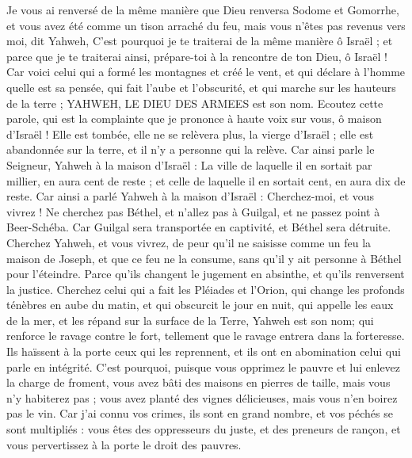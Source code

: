 \begin{multicols}{2}
Je vous ai renversé de la même manière que Dieu renversa Sodome et Gomorrhe, et vous avez été comme un tison arraché du feu, mais vous n'êtes pas revenus vers moi, dit Yahweh,
C'est pourquoi je te traiterai de la même manière ô Israël ; et parce que je te traiterai ainsi, prépare-toi à la rencontre de ton Dieu, ô Israël !
Car voici celui qui a formé les montagnes et créé le vent, et qui déclare à l'homme quelle est sa pensée, qui fait l'aube et l'obscurité, et qui marche sur les hauteurs de la terre ; YAHWEH, LE DIEU DES ARMEES est son nom.
\VerseOne{}Ecoutez cette parole, qui est la complainte que je prononce à haute voix sur vous, ô maison d'Israël !
Elle est tombée, elle ne se relèvera plus, la vierge d'Israël ; elle est abandonnée sur la terre, et il n'y a personne qui la relève.
Car ainsi parle le Seigneur, Yahweh à la maison d'Israël : La ville de laquelle il en sortait par millier, en aura cent de reste ; et celle de laquelle il en sortait cent, en aura dix de reste.
Car ainsi a parlé Yahweh à la maison d'Israël : Cherchez-moi, et vous vivrez !
Ne cherchez pas Béthel, et n'allez pas à Guilgal, et ne passez point à Beer-Schéba. Car Guilgal sera transportée en captivité, et Béthel sera détruite.
Cherchez Yahweh, et vous vivrez, de peur qu'il ne saisisse comme un feu la maison de Joseph, et que ce feu ne la consume, sans qu'il y ait personne à Béthel pour l'éteindre.
Parce qu'ils changent le jugement en absinthe, et qu'ils renversent la justice.
Cherchez celui qui a fait les Pléiades et l'Orion, qui change les profonds ténèbres en aube du matin, et qui obscurcit le jour en nuit, qui appelle les eaux de la mer, et les répand sur la surface de la Terre, Yahweh est son nom;
qui renforce le ravage contre le fort, tellement que le ravage entrera dans la forteresse.
Ils haïssent à la porte ceux qui les reprennent, et ils ont en abomination celui qui parle en intégrité.
C'est pourquoi, puisque vous opprimez le pauvre et lui enlevez la charge de froment, vous avez bâti des maisons en pierres de taille, mais vous n'y habiterez pas ; vous avez planté des vignes délicieuses, mais vous n'en boirez pas le vin.
Car j'ai connu vos crimes, ils sont en grand nombre, et vos péchés se sont multipliés : vous êtes des oppresseurs du juste, et des preneurs de rançon, et vous pervertissez à la porte le droit des pauvres. 

\end{multicols}
